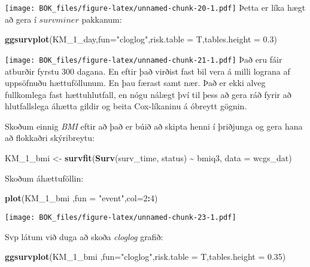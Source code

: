 \documentclass[
]{book}
\newenvironment{Shaded}{\begin{snugshade}}{\end{snugshade}}
\newcommand{\DataTypeTok}[1]{\textcolor[rgb]{0.13,0.29,0.53}{#1}}
\newcommand{\DecValTok}[1]{\textcolor[rgb]{0.00,0.00,0.81}{#1}}
\newcommand{\FloatTok}[1]{\textcolor[rgb]{0.00,0.00,0.81}{#1}}
\newcommand{\KeywordTok}[1]{\textcolor[rgb]{0.13,0.29,0.53}{\textbf{#1}}}
\newcommand{\NormalTok}[1]{#1}
\newcommand{\OperatorTok}[1]{\textcolor[rgb]{0.81,0.36,0.00}{\textbf{#1}}}
\newcommand{\StringTok}[1]{\textcolor[rgb]{0.31,0.60,0.02}{#1}}
\begin{document}
\texttt{[image: BOK\_files/figure-latex/unnamed-chunk-20-1.pdf]}
Þetta er líka hægt að gera í \(survminer\) pakkanum:

\begin{Shaded}
\begin{Highlighting}[]
\KeywordTok{ggsurvplot}\NormalTok{(KM\_}\DecValTok{1}\NormalTok{\_day,}\DataTypeTok{fun=}\StringTok{"cloglog"}\NormalTok{,}\DataTypeTok{risk.table =}\NormalTok{ T,}\DataTypeTok{tables.height =} \FloatTok{0.3}\NormalTok{)}
\end{Highlighting}
\end{Shaded}

\texttt{[image: BOK\_files/figure-latex/unnamed-chunk-21-1.pdf]}
Það eru fáir atburðir fyrstu 300 dagana. En eftir það virðist fast bil vera á milli lograna af uppsöfnuðu hættuföllunum. En þau færast samt nær. Það er ekki alveg fullkomlega fast hættuhlutfall, en nógu nálægt því til þess að gera ráð fyrir að hlutfallslega áhætta gildir og beita Cox-líkaninu á óbreytt gögnin.

Skoðum einnig \emph{BMI} eftir að það er búið að skipta henni í þriðjunga og gera hana að flokkaðri skýribreytu:

\begin{Shaded}
\begin{Highlighting}[]
\NormalTok{KM\_}\DecValTok{1}\NormalTok{\_bmi <{-}}\StringTok{ }\KeywordTok{survfit}\NormalTok{(}\KeywordTok{Surv}\NormalTok{(surv\_time, status) }\OperatorTok{\textasciitilde{}}\StringTok{ }\NormalTok{bmiq3, }\DataTypeTok{data =}\NormalTok{ wcgs\_dat)}
\end{Highlighting}
\end{Shaded}

Skoðum áhættuföllin:

\begin{Shaded}
\begin{Highlighting}[]
\KeywordTok{plot}\NormalTok{(KM\_}\DecValTok{1}\NormalTok{\_bmi ,}\DataTypeTok{fun =} \StringTok{"event"}\NormalTok{,}\DataTypeTok{col=}\DecValTok{2}\OperatorTok{:}\DecValTok{4}\NormalTok{)}
\end{Highlighting}
\end{Shaded}

\texttt{[image: BOK\_files/figure-latex/unnamed-chunk-23-1.pdf]}

Svp látum við duga að skoða \emph{cloglog} grafið:

\begin{Shaded}
\begin{Highlighting}[]
\KeywordTok{ggsurvplot}\NormalTok{(KM\_}\DecValTok{1}\NormalTok{\_bmi ,}\DataTypeTok{fun=}\StringTok{"cloglog"}\NormalTok{,}\DataTypeTok{risk.table =}\NormalTok{ T,}\DataTypeTok{tables.height =} \FloatTok{0.35}\NormalTok{)}
\end{Highlighting}
\end{Shaded}
\end{document}
